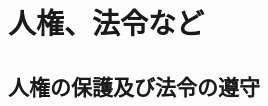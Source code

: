 \documentclass[11pt,a4paper,uplatex,twoside,dvipdfmx]{ujarticle} 	%
\newcommand{\研究課題名}{\mgfamily ストカスティック形式、原始ブラックホール、重力波観測から迫るインフレーション}
\newcommand{\研究機関名}{\mgfamily 名古屋大学}
\newcommand{\申請者氏名}{\mgfamily 多田 祐一郎}
\newcommand{\研究代表者氏名}{\申請者氏名}
\newcommand{\研究期間の最終元号年度}{34}	%
\begin{document}
{	%
	
}

\section{人権、法令など}
\subsection{人権の保護及び法令の遵守}
\newcommand{\人権の保護及び法令等の遵守への対応}{%
	本研究は該当しない.
}

\end{document}
